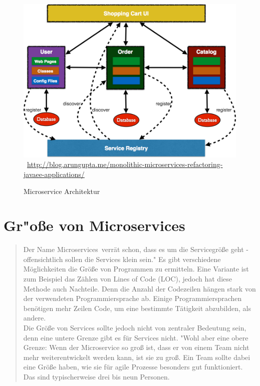 \begin{figure}[htb]
	\centering 
	\includegraphics[width=\linewidth]{content/images/javaee-microservices}\
	\quelle\url{http://blog.arungupta.me/monolithic-microservices-refactoring-javaee-applications/}
	\caption{Microservice Architektur\\}
	\label{fig:MicroserviceArchitektur} 
\end{figure}

\section{Gr"o\ss e von Microservices}
\label{sec:groesseMicroservice}
\begin{quotation}
    \frqq Der Name \frqq Microservices\flqq\ verrät schon, dass es um die Servicegröße geht - offensichtlich sollen die Services klein sein."\cite[S. 31]{EWolff2016:Microservices} Es gibt verschiedene Möglichkeiten die Größe von Programmen zu ermitteln. Eine Variante ist zum Beispiel das Zählen von  Lines of Code (LOC), jedoch hat diese Methode auch Nachteile. Denn die Anzahl der Codezeilen hängen stark von der verwendeten Programmiersprache ab. Einige Programmiersprachen benötigen mehr Zeilen Code, um eine bestimmte Tätigkeit abzubilden, als andere.
    \\
    Die Größe von Services sollte jedoch nicht von zentraler Bedeutung sein, denn eine untere Grenze gibt es für Services nicht. "Wohl aber eine obere Grenze: Wenn der Microservice so groß ist, dass er von einem Team nicht mehr weiterentwickelt werden kann, ist sie zu groß. Ein Team sollte dabei eine Größe haben, wie sie für agile Prozesse besonders gut funktioniert. Das sind typischerweise drei bis neun Personen.\flqq\cite[S. 34]{EWolff2016:Microservices}
\end{quotation}

